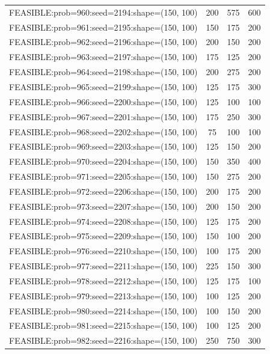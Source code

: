 \begin{longtable}{lccc}
FEASIBLE:prob=960:seed=2194:shape=(150, 100) &      200 &   575 &    600 \\
FEASIBLE:prob=961:seed=2195:shape=(150, 100) &      150 &   175 &    200 \\
FEASIBLE:prob=962:seed=2196:shape=(150, 100) &      200 &   150 &    200 \\
FEASIBLE:prob=963:seed=2197:shape=(150, 100) &      175 &   125 &    200 \\
FEASIBLE:prob=964:seed=2198:shape=(150, 100) &      200 &   275 &    200 \\
FEASIBLE:prob=965:seed=2199:shape=(150, 100) &      125 &   175 &    300 \\
FEASIBLE:prob=966:seed=2200:shape=(150, 100) &      125 &   100 &    100 \\
FEASIBLE:prob=967:seed=2201:shape=(150, 100) &      175 &   250 &    300 \\
FEASIBLE:prob=968:seed=2202:shape=(150, 100) &       75 &   100 &    100 \\
FEASIBLE:prob=969:seed=2203:shape=(150, 100) &      125 &   150 &    200 \\
FEASIBLE:prob=970:seed=2204:shape=(150, 100) &      150 &   350 &    400 \\
FEASIBLE:prob=971:seed=2205:shape=(150, 100) &      150 &   275 &    200 \\
FEASIBLE:prob=972:seed=2206:shape=(150, 100) &      200 &   175 &    200 \\
FEASIBLE:prob=973:seed=2207:shape=(150, 100) &      200 &   150 &    200 \\
FEASIBLE:prob=974:seed=2208:shape=(150, 100) &      125 &   175 &    200 \\
FEASIBLE:prob=975:seed=2209:shape=(150, 100) &      150 &   100 &    200 \\
FEASIBLE:prob=976:seed=2210:shape=(150, 100) &      100 &   175 &    200 \\
FEASIBLE:prob=977:seed=2211:shape=(150, 100) &      225 &   150 &    300 \\
FEASIBLE:prob=978:seed=2212:shape=(150, 100) &      125 &   175 &    100 \\
FEASIBLE:prob=979:seed=2213:shape=(150, 100) &      100 &   125 &    200 \\
FEASIBLE:prob=980:seed=2214:shape=(150, 100) &      100 &   150 &    200 \\
FEASIBLE:prob=981:seed=2215:shape=(150, 100) &      100 &   125 &    200 \\
FEASIBLE:prob=982:seed=2216:shape=(150, 100) &      250 &   750 &    300 \\

\end{longtable}
